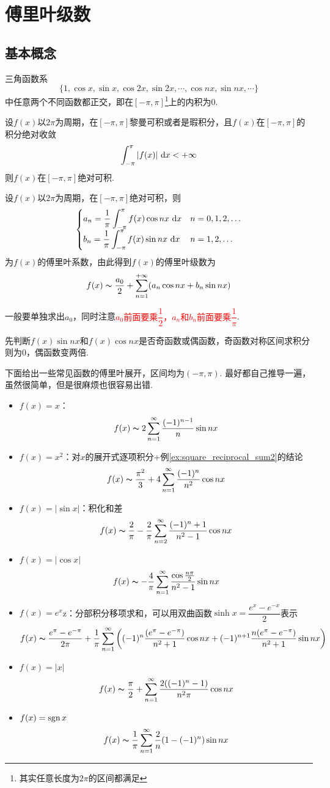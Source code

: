
\section{傅里叶级数}
\subsection{基本概念}
\begin{theorem}[三角函数系]
三角函数系
\[\{1,\cos x,\sin x,\cos 2x,\sin 2x,\cdots,\cos nx,\sin nx,\cdots\}\]
中任意两个不同函数都正交，即在$[-\pi,\pi]$\footnote{其实任意长度为$2\pi$的区间都满足}上的内积为$0$.
\end{theorem}
\begin{definition}[绝对可积]
设$f(x)$以$2\pi$为周期，在$[-\pi,\pi]$黎曼可积或者是瑕积分，且$f(x)$在$[-\pi,\pi]$的积分绝对收敛
\[\displaystyle\int_{-\pi}^{\pi}{|f(x)|}\,\,\mathrm{d} x<+\infty\]
则$f(x)$在$[-\pi,\pi]$绝对可积.
\end{definition}
\begin{definition}[傅里叶级数]
设$f(x)$以$2\pi$为周期，在$[-\pi,\pi]$绝对可积，则
\[\begin{cases}
a_n=\dfrac{1}{\pi}\displaystyle\int_{-\pi}^{\pi}{f(x)\cos nx}\,\,\mathrm{d} x & n=0,1,2,\ldots\\
b_n=\dfrac{1}{\pi}\displaystyle\int_{-\pi}^{\pi}{f(x)\sin nx}\,\,\mathrm{d} x & n=1,2,\ldots
\end{cases}\]
为$f(x)$的傅里叶系数，由此得到$f(x)$的傅里叶级数为
\[f(x)\thicksim\dfrac{a_0}{2}+\sum_{n=1}^{+\infty}(a_n\cos nx+b_n\sin nx)\]
\end{definition}
\par 一般要单独求出$a_0$，同时注意\textcolor{red}{$a_0$前面要乘$\dfrac{1}{2}$，$a_n$和$b_n$前面要乘$\dfrac{1}{\pi}$}.
\par 先判断$f(x)\sin nx$和$f(x)\cos nx$是否奇函数或偶函数，奇函数对称区间求积分则为$0$，偶函数变两倍.
\par 下面给出一些常见函数的傅里叶展开，区间均为$(-\pi,\pi)$.
最好都自己推导一遍，虽然很简单，但是很麻烦也很容易出错.
\begin{itemize}
	\item $f(x)=x$：
	\[f(x)\thicksim 2\displaystyle\sum_{n=1}^{\infty}\dfrac{(-1)^{n-1}}{n}\sin nx\]
	\item $f(x)=x^2$：对$x$的展开式逐项积分+例\ref{ex:square_reciprocal_sum2}的结论
	\[f(x)\thicksim \dfrac{\pi^2}{3}+4\displaystyle\sum_{n=1}^{\infty}\dfrac{(-1)^{n}}{n^2}\cos nx\]
	\item $f(x)=|\sin x|$：积化和差
	\[f(x)\thicksim \dfrac{2}{\pi}-\dfrac{2}{\pi}\sum_{n=2}^\infty\dfrac{(-1)^n+1}{n^2-1}\cos nx\]
	\item $f(x)=|\cos x|$
	\[f(x)\thicksim -\frac{4}{\pi}\displaystyle\sum_{n=1}^{\infty}\dfrac{\cos\frac{n\pi}{2}}{n^2-1}\sin nx\]
	\item $f(x)=e^x$z：分部积分移项求和，可以用双曲函数$\sinh x=\dfrac{e^x-e^{-x}}{2}$表示
	\[f(x)\thicksim \dfrac{e^\pi-e^{-\pi}}{2\pi}+\dfrac{1}{\pi}\displaystyle\sum_{n=1}^{\infty}\left((-1)^n\dfrac{(e^\pi-e^{-\pi})}{n^2+1}\cos nx+(-1)^{n+1}\dfrac{n(e^\pi-e^{-\pi})}{n^2+1}\sin nx\right)\]
	\item $f(x)=|x|$
	\[f(x)\thicksim \dfrac{\pi}{2}+\displaystyle\sum_{n=1}^{\infty}\dfrac{2((-1)^n-1)}{n^2\pi}\cos nx\]
	\item $f(x)=\mathrm{sgn}\, x$
	\[f(x)\thicksim \dfrac{1}{\pi}\displaystyle\sum_{n=1}^{\infty}\dfrac{2}{n}(1-(-1)^n)\sin nx\]
\end{itemize}
